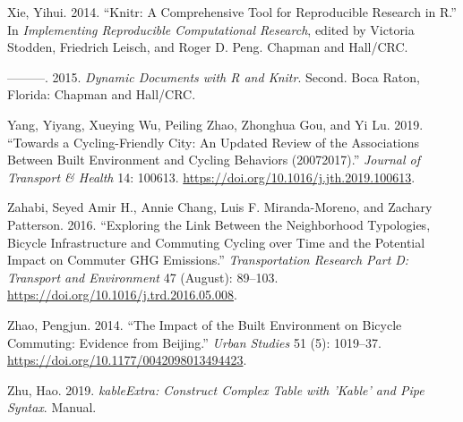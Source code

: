 \documentclass[smallextended]{svjour3}       %
\begin{document}
\leavevmode\hypertarget{ref-Xie2014}{}%
Xie, Yihui. 2014. ``Knitr: A Comprehensive Tool for Reproducible
Research in R.'' In \emph{Implementing Reproducible Computational
Research}, edited by Victoria Stodden, Friedrich Leisch, and Roger D.
Peng. Chapman and Hall/CRC.

\leavevmode\hypertarget{ref-Xie2015}{}%
---------. 2015. \emph{Dynamic Documents with R and Knitr}. Second. Boca
Raton, Florida: Chapman and Hall/CRC.

\leavevmode\hypertarget{ref-yangCyclingfriendlyCityUpdated2019}{}%
Yang, Yiyang, Xueying Wu, Peiling Zhao, Zhonghua Gou, and Yi Lu. 2019.
``Towards a Cycling-Friendly City: An Updated Review of the Associations
Between Built Environment and Cycling Behaviors (20072017).''
\emph{Journal of Transport \& Health} 14: 100613.
\url{https://doi.org/10.1016/j.jth.2019.100613}.

\leavevmode\hypertarget{ref-Zahabi2016}{}%
Zahabi, Seyed Amir H., Annie Chang, Luis F. Miranda-Moreno, and Zachary
Patterson. 2016. ``Exploring the Link Between the Neighborhood
Typologies, Bicycle Infrastructure and Commuting Cycling over Time and
the Potential Impact on Commuter GHG Emissions.'' \emph{Transportation
Research Part D: Transport and Environment} 47 (August): 89--103.
\url{https://doi.org/10.1016/j.trd.2016.05.008}.

\leavevmode\hypertarget{ref-Zhao2014}{}%
Zhao, Pengjun. 2014. ``The Impact of the Built Environment on Bicycle
Commuting: Evidence from Beijing.'' \emph{Urban Studies} 51 (5):
1019--37. \url{https://doi.org/10.1177/0042098013494423}.

\leavevmode\hypertarget{ref-Zhu2019}{}%
Zhu, Hao. 2019. \emph{kableExtra: Construct Complex Table with 'Kable'
and Pipe Syntax}. Manual.




\end{document}
